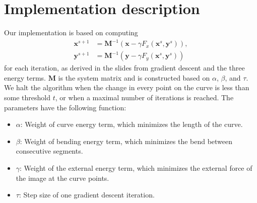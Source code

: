 \documentclass[11pt,a4paper]{article}
\begin{document}
\section{Implementation description}
%
Our implementation is based on computing
%
\begin{align}
\mathbf{x}^{s+1} &= \mathbf{M}^{-1} (\mathbf{x} - \gamma F_x(\mathbf{x}^s, \mathbf{y}^s)), \\
\mathbf{y}^{s+1} &= \mathbf{M}^{-1} (\mathbf{y} - \gamma F_y(\mathbf{x}^s, \mathbf{y}^s))
\end{align}
%
for each iteration, as derived in the slides from gradient descent and the three energy terms. $\mathbf{M}$ is the system matrix and is constructed based on $\alpha$, $\beta$, and $\tau$. We halt the algorithm when the change in every point on the curve is less than some threshold $t$, or when a maximal number of iterations is reached. The parameters have the following function:
%
\begin{itemize}
\item $\alpha$: Weight of curve energy term, which minimizes the length of the curve.
\item $\beta$: Weight of bending energy term, which minimizes the bend between consecutive segments.
\item $\gamma$: Weight of the external energy term, which minimizes the external force of the image at the curve points.
\item $\tau$: Step size of one gradient descent iteration.
\end{itemize}
%
\end{document}
